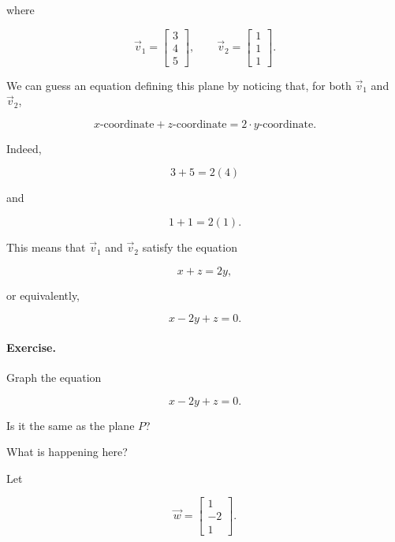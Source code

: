 where

\[
\vec v_1=
\begin{bmatrix}
3\\
4\\
5
\end{bmatrix},
\qquad
\vec v_2=
\begin{bmatrix}
1\\
1\\
1
\end{bmatrix}.
\]

We can guess an equation defining this plane by noticing that, for both
$\vec v_1$ and $\vec v_2$,

\[
\text{$x$-coordinate}+\text{$z$-coordinate}
=
2\cdot\text{$y$-coordinate}.
\]

Indeed,

\[
3+5=2(4)
\]

and

\[
1+1=2(1).
\]

This means that $\vec v_1$ and $\vec v_2$ satisfy the equation

\[
x+z=2y,
\]

or equivalently,

\[
x-2y+z=0.
\]

\paragraph{Exercise.}
Graph the equation

\[
x-2y+z=0.
\]

Is it the same as the plane $P$?

What is happening here?

Let

\[
\vec w=
\begin{bmatrix}
1\\
-2\\
1
\end{bmatrix}.
\]

